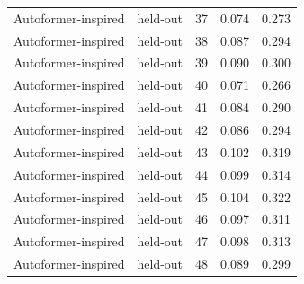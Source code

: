 \begin{tabular}{llrrr}
Autoformer-inspired & held-out & 37 & 0.074 & 0.273 \\
Autoformer-inspired & held-out & 38 & 0.087 & 0.294 \\
Autoformer-inspired & held-out & 39 & 0.090 & 0.300 \\
Autoformer-inspired & held-out & 40 & 0.071 & 0.266 \\
Autoformer-inspired & held-out & 41 & 0.084 & 0.290 \\
Autoformer-inspired & held-out & 42 & 0.086 & 0.294 \\
Autoformer-inspired & held-out & 43 & 0.102 & 0.319 \\
Autoformer-inspired & held-out & 44 & 0.099 & 0.314 \\
Autoformer-inspired & held-out & 45 & 0.104 & 0.322 \\
Autoformer-inspired & held-out & 46 & 0.097 & 0.311 \\
Autoformer-inspired & held-out & 47 & 0.098 & 0.313 \\
Autoformer-inspired & held-out & 48 & 0.089 & 0.299 \\
\bottomrule
\end{tabular}
